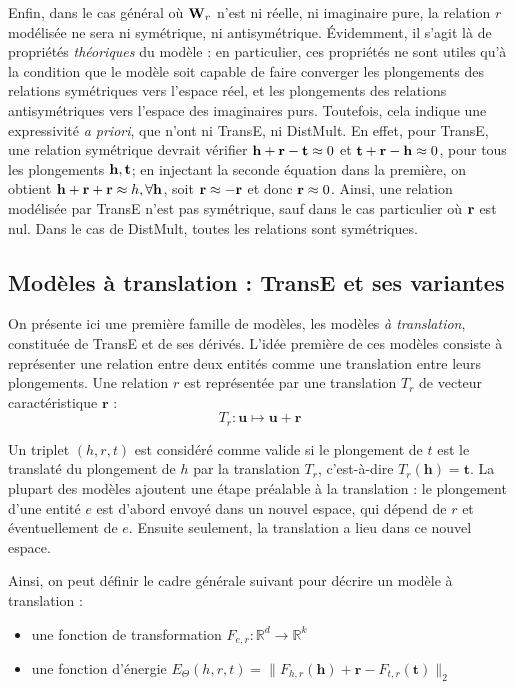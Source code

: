 Enfin, dans le cas général où $\bf{W}_r$ n'est ni réelle, ni imaginaire pure, la relation $r$ modélisée ne sera ni symétrique, ni antisymétrique. Évidemment, il s'agit là de propriétés \textit{théoriques} du modèle : en particulier, ces propriétés ne sont utiles qu'à la condition que le modèle soit capable de faire converger les plongements des relations symétriques vers l'espace réel, et les plongements des relations antisymétriques vers l'espace des imaginaires purs. Toutefois, cela indique une expressivité \textit{a priori}, que n'ont ni TransE, ni DistMult. En effet, pour TransE, une relation symétrique devrait vérifier $\bf{h + r - t} \approx 0$ et $\bf{t + r - h} \approx 0$, pour tous les plongements $\bf{h, t}$; en injectant la seconde équation dans la première, on obtient $\bf{h + r + r} \approx h, \forall \bf{h}$, soit $\bf{r \approx -r}$ et donc $\bf{r} \approx 0$. Ainsi,  une relation modélisée par TransE n'est pas symétrique, sauf dans le cas particulier où $\bf{r}$ est nul. Dans le cas de DistMult, toutes les relations sont symétriques.


\subsection{Modèles à translation : TransE et ses variantes}
\label{subsec:kge-models-transx}

On présente ici une première famille de modèles, les modèles \textit{à translation}, constituée de TransE et de ses dérivés. L'idée première de ces modèles consiste à représenter une relation entre deux entités comme une translation entre leurs plongements. Une relation $r$ est représentée par une translation $T_r$ de vecteur caractéristique $\mathbf{r}$ :
\begin{equation*}
    T_r : \mathbf{u} \mapsto \mathbf{u + r}
\end{equation*}

Un triplet $(h, r, t)$ est considéré comme valide si le plongement de $t$ est le translaté du plongement de $h$ par la translation $T_r$, c'est-à-dire $T_r(\mathbf{h}) = \mathbf{t}$. La plupart des modèles ajoutent une étape préalable à la translation : le plongement d'une entité $e$ est d'abord envoyé dans un nouvel espace, qui dépend de $r$ et éventuellement de $e$. Ensuite seulement, la translation a lieu dans ce nouvel espace.

Ainsi, on peut définir le cadre générale suivant pour décrire un modèle à translation :
\begin{itemize}
    \item une fonction de transformation $F_{e, r} : \mathbb{R}^d \rightarrow \mathbb{R}^{k}$
    \item une fonction d'énergie $E_\Theta(h, r, t) = \| F_{h, r}(\mathbf{h}) + \mathbf{r} - F_{t, r}(\mathbf{t}) \|_2 $
\end{itemize}

